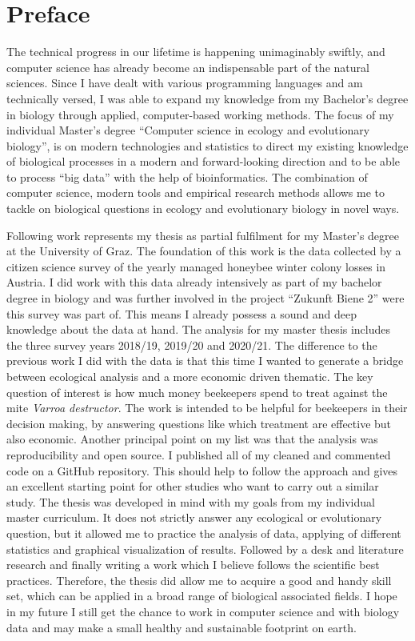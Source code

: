 \chapter*{Preface}
\label{sec:Preface}
\vspace*{-10mm}

The technical progress in our lifetime is happening unimaginably swiftly, and computer science has already become an indispensable part of the natural sciences. Since I have dealt with various programming languages and am technically versed, I was able to expand my knowledge from my Bachelor's degree in biology through applied, computer-based working methods. The focus of my individual Master's degree \enquote{Computer science in ecology and evolutionary biology}, is on modern technologies and statistics to direct my existing knowledge of biological processes in a modern and forward-looking direction and to be able to process \enquote{big data} with the help of bioinformatics. The combination of computer science, modern tools and empirical research methods allows me to tackle on biological questions in ecology and evolutionary biology in novel ways.


Following work represents my thesis as partial fulfilment for my Master's degree at the University of Graz. The foundation of this work is the data collected by a citizen science survey of the yearly managed honeybee winter colony losses in Austria. I did work with this data already intensively as part of my bachelor degree in biology and was further involved in the project \enquote{Zukunft Biene 2} were this survey was part of. This means I already possess a sound and deep knowledge about the data at hand. The analysis for my master thesis includes the three survey years 2018/19, 2019/20 and 2020/21. The difference to the previous work I did with the data is that this time I wanted to generate a bridge between ecological analysis and a more economic driven thematic. The key question of interest is how much money beekeepers spend to treat against the mite \textit{Varroa destructor}. The work is intended to be helpful for beekeepers in their decision making, by answering questions like which treatment are effective but also economic. Another principal point on my list was that the analysis was reproducibility and open source. I published all of my cleaned and commented code on a GitHub repository. This should help to follow the approach and gives an excellent starting point for other studies who want to carry out a similar study. The thesis was developed in mind with my goals from my individual master curriculum. It does not strictly answer any ecological or evolutionary question, but it allowed me to practice the analysis of data, applying of different statistics and graphical visualization of results. Followed by a desk and literature research and finally writing a work which I believe follows the scientific best practices. Therefore, the thesis did allow me to acquire a good and handy skill set, which can be applied in a broad range of biological associated fields. I hope in my future I still get the chance to work in computer science and with biology data and may make a small healthy and sustainable footprint on earth.